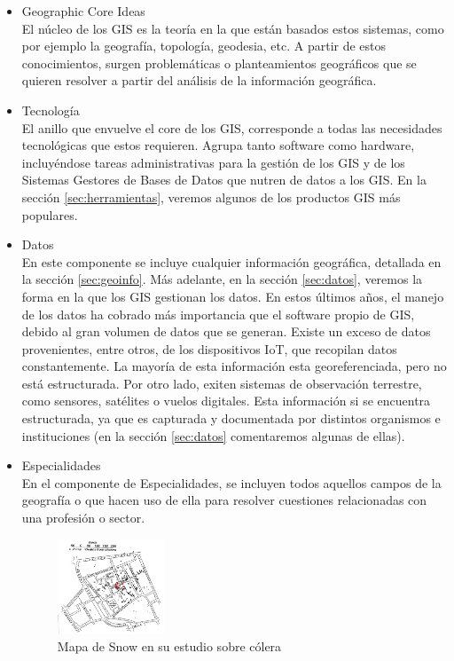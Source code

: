\begin{itemize}
  \item Geographic Core Ideas\\
  El núcleo de los GIS es la teoría en la que están basados estos sistemas, como por ejemplo la geografía, topología, geodesia, etc. 
  A partir de estos conocimientos, surgen problemáticas o planteamientos geográficos que se quieren resolver a partir del análisis de la información geográfica.

  \item Tecnología\\
  El anillo que envuelve el core de los GIS, corresponde a todas las necesidades tecnológicas que estos requieren. 
  Agrupa tanto software como hardware, incluyéndose tareas administrativas para la gestión de los GIS y de los Sistemas Gestores de Bases de Datos que nutren de datos a los GIS.
  En la sección \ref{sec:herramientas}, veremos algunos de los productos GIS más populares.

  \item Datos\\
  En este componente se incluye cualquier información geográfica, detallada en la sección \ref{sec:geoinfo}.
  Más adelante, en la sección \ref{sec:datos}, veremos la forma en la que los GIS gestionan los datos.
  En estos últimos años, el manejo de los datos ha cobrado más importancia que el software propio de GIS, debido al gran volumen de datos que se generan. 
  Existe un exceso de datos provenientes, entre otros, de los dispositivos IoT, que recopilan datos constantemente. 
  La mayoría de esta información esta georeferenciada, pero no está estructurada.   
  Por otro lado, exiten sistemas de observación terrestre, como sensores, satélites o vuelos digitales. 
  Esta información si se encuentra estructurada, ya que es capturada y documentada por distintos organismos e instituciones (en la sección \ref{sec:datos} comentaremos algunas de ellas).
\\
  \item Especialidades\\
  En el componente de Especialidades, se incluyen todos aquellos campos de la geografía o que hacen uso de ella para resolver cuestiones relacionadas con una profesión o sector.
 
  \begin{figure}[H]
    \centering
    \includegraphics[width=0.30\textwidth]{Imagenes/GIS/Snow-cholera-map.png}
    \caption{Mapa de Snow en su estudio sobre cólera} \label{fig:SnowColeraMap}
  \end{figure}


\end{itemize}
